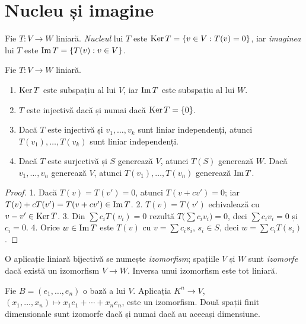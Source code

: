 \section{Nucleu și imagine}

\begin{definitie}
Fie $T:V\to W$ liniară. \emph{Nucleul} lui $T$ este $\operatorname{Ker} T=\{v\in V: T(v)=0\}$, iar \emph{imaginea} lui $T$ este $\operatorname{Im} T=\{T(v): v\in V\}$.
\end{definitie}

\begin{propozitie}\label{prop:kerim}
Fie $T:V\to W$ liniară.
\begin{enumerate}
\item $\operatorname{Ker} T$ este subspațiu al lui $V$, iar $\operatorname{Im} T$ este subspațiu al lui $W$.
\item $T$ este injectivă dacă și numai dacă $\operatorname{Ker} T=\{0\}$.
\item Dacă $T$ este injectivă și $v_1,\dots,v_k$ sunt liniar independenți, atunci $T(v_1),\dots,T(v_k)$ sunt liniar independenți.
\item Dacă $T$ este surjectivă și $S$ generează $V$, atunci $T(S)$ generează $W$. Dacă $v_1,\dots,v_n$ generează $V$, atunci $T(v_1),\dots,T(v_n)$ generează $\operatorname{Im} T$.
\end{enumerate}
\end{propozitie}

\begin{proof}
1. Dacă $T(v)=T(v')=0$, atunci $T(v+cv')=0$; iar $T(v)+cT(v')=T(v+cv')\in\operatorname{Im} T$.
2. $T(v)=T(v')$ echivalează cu $v-v'\in\operatorname{Ker} T$.
3. Din $\sum c_iT(v_i)=0$ rezultă $T\bigl(\sum c_iv_i\bigr)=0$, deci $\sum c_iv_i=0$ și $c_i=0$.
4. Orice $w\in\operatorname{Im} T$ este $T(v)$ cu $v=\sum c_is_i$, $s_i\in S$, deci $w=\sum c_iT(s_i)$.
\end{proof}

\begin{definitie}
O aplicație liniară bijectivă se numește \emph{izomorfism}; spațiile $V$ și $W$ sunt \emph{izomorfe} dacă există un izomorfism $V\to W$. Inversa unui izomorfism este tot liniară.
\end{definitie}

\begin{propozitie}\label{prop:coordonate}
Fie $B=(e_1,\dots,e_n)$ o bază a lui $V$. Aplicația $K^n\to V$, $(x_1,\dots,x_n)\mapsto x_1e_1+\cdots+x_ne_n$, este un izomorfism. Două spații finit dimensionale sunt izomorfe dacă și numai dacă au aceeași dimensiune.
\end{propozitie}

